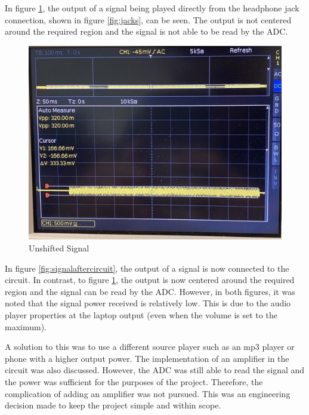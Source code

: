 \documentclass{cce2014-design}
\begin{document}
\newpage

In figure \ref*{fig:signalbeforecircuit}, the output of a signal being played directly from the headphone jack connection, shown in figure \ref{fig:jacks}, can be seen.
The output is not centered around the required region and the signal is not able to be read by the ADC.

\vspace{1em}
\begin{figure}[!h]
   \centering
   \includegraphics[width=0.8\linewidth]{signal_unshifted.jpg}
   \caption{Unshifted Signal}
   \label{fig:signalbeforecircuit}
\end{figure}
\vspace{1em}

In figure \ref*{fig:signalaftercircuit}, the output of a signal is now connected to the circuit.
In contrast, to figure \ref*{fig:signalbeforecircuit}, the output is now centered around the required region and the signal can be read by the ADC.
However, in both figures, it was noted that the signal power received is relatively low.
This is due to the audio player properties at the laptop output (even when the volume is set to the maximum).

A solution to this was to use a different source player such as an mp3 player or phone with a higher output power.
The implementation of an amplifier in the circuit was also discussed.
However, the ADC was still able to read the signal and the power was sufficient for the purposes of the project.
Therefore, the complication of adding an amplifier was not pursued.
This was an engineering decision made to keep the project simple and within scope.
\end{document}
